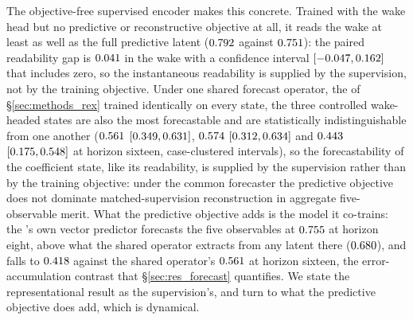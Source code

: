 The objective-free supervised encoder makes this concrete. Trained with the wake head but no predictive or reconstructive objective at all, it reads the wake at least as well as the full predictive latent ($0.792$ against $0.751$): the paired readability gap is $0.041$ in the wake with a confidence interval $[-0.047, 0.162]$ that includes zero, so the instantaneous readability is supplied by the supervision, not by the training objective.
Under one shared forecast operator, the \DirectFC{} of \S\ref{sec:methods_rex} trained identically on every state, the three controlled wake-headed states are also the most forecastable and are statistically indistinguishable from one another ($0.561$ $[0.349, 0.631]$, $0.574$ $[0.312, 0.634]$ and $0.443$ $[0.175, 0.548]$ at horizon sixteen, case-clustered intervals), so the forecastability of the coefficient state, like its readability, is supplied by the supervision rather than by the training objective: under the common forecaster the predictive objective does not dominate matched-supervision reconstruction in aggregate five-observable merit. What the predictive objective adds is the model it co-trains: the \PredState's own vector predictor forecasts the five observables at $0.755$ at horizon eight, above what the shared operator extracts from any latent there ($0.680$), and falls to $0.418$ against the shared operator's $0.561$ at horizon sixteen, the error-accumulation contrast that \S\ref{sec:res_forecast} quantifies. We state the representational result as the supervision's, and turn to what the predictive objective does add, which is dynamical.\re

